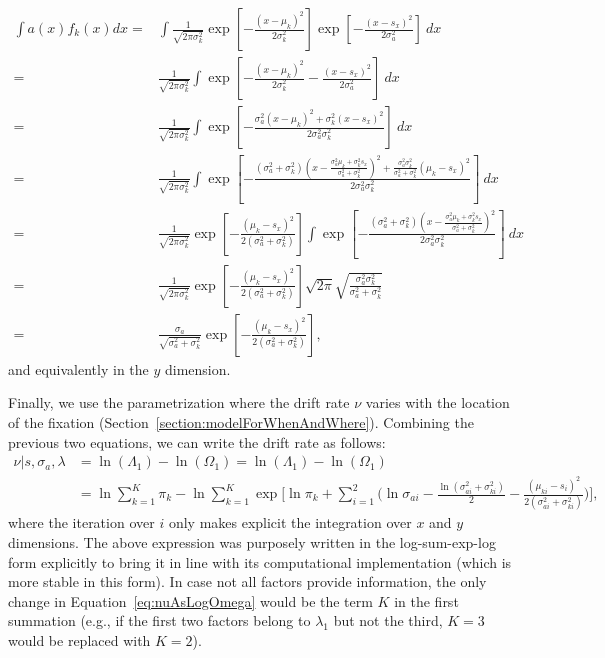 \documentclass{article}
\begin{document}
\begin{equation}
\begin{aligned}
\int a(x)f_k(x) dx = & \int \frac{1}{\sqrt{2\pi\sigma_k^2}} \exp\left[-\frac{(x-\mu_k)^2}{2\sigma_k^2}\right] \exp\left[-\frac{(x-s_x)^2}{2\sigma_a^2}\right]~dx \\
= & \frac{1}{\sqrt{2\pi\sigma_k^2}} \int \exp\left[-\frac{(x-\mu_k)^2}{2\sigma_k^2} - \frac{(x-s_x)^2}{2\sigma_a^2}\right]~dx \\
= & \frac{1}{\sqrt{2\pi\sigma_k^2}} \int \exp\left[-\frac{\sigma_a^2(x-\mu_k)^2 + \sigma_k^2(x-s_x)^2}{2\sigma_a^2\sigma_k^2} \right]~dx \\
= & \frac{1}{\sqrt{2\pi\sigma_k^2}} \int \exp\left[-\frac{(\sigma_a^2+\sigma_k^2)\left(x-\frac{\sigma_a^2\mu_k + \sigma_k^2s_x}{\sigma_a^2+\sigma_k^2}\right)^2 + \frac{\sigma_a^2\sigma_k^2}{\sigma_a^2 + \sigma_k^2}(\mu_k-s_x)^2}{2\sigma_a^2\sigma_k^2} \right]~dx \\
= & \frac{1}{\sqrt{2\pi\sigma_k^2}} \exp\left[-\frac{(\mu_k-s_x)^2}{2(\sigma_a^2 + \sigma_k^2)}\right] \int \exp\left[-\frac{(\sigma_a^2+\sigma_k^2)\left(x-\frac{\sigma_a^2\mu_k + \sigma_k^2s_x}{\sigma_a^2+\sigma_k^2}\right)^2}{2\sigma_a^2\sigma_k^2} \right]~dx \\
= & \frac{1}{\sqrt{2\pi\sigma_k^2}} \exp\left[-\frac{(\mu_k-s_x)^2}{2(\sigma_a^2 + \sigma_k^2)}\right] \sqrt{2\pi} \sqrt{\frac{\sigma_a^2\sigma_k^2}{\sigma_a^2+\sigma_k^2}} \\
= & \frac{\sigma_a}{\sqrt{\sigma_a^2+\sigma_k^2}} \exp\left[-\frac{(\mu_k-s_x)^2}{2(\sigma_a^2 + \sigma_k^2)}\right],
\end{aligned}
\end{equation}
and equivalently in the $y$ dimension.

Finally, we use the parametrization where the drift rate $\nu$ varies with the location of the fixation (Section~\ref{section:modelForWhenAndWhere}). Combining the previous two equations, we can write the drift rate as follows:
\begin{equation}
\label{eq:nuAsLogOmega}
\begin{aligned}
\nu | s, \sigma_a, \lambda & = \ln(\Lambda_1) - \ln(\Omega_1) = \ln(\Lambda_1) - \ln(\Omega_1) \\
& = \ln\sum_{k=1}^K \pi_k- \ln \sum_{k=1}^K \exp \Bigg[\ln \pi_k + \sum_{i=1}^2 \Big( \ln \sigma_{ai} - \frac{\ln (\sigma_{ai}^2+ \sigma_{ki}^2)}{2} - \frac{(\mu_{ki} - s_i)^2}{2(\sigma_{ai}^2 + \sigma_{ki}^2)} \Big)  \Bigg],
\end{aligned}
\end{equation}
where the iteration over $i$ only makes explicit the integration over $x$ and $y$ dimensions. The above expression was purposely written in the log-sum-exp-log form explicitly to bring it in line with its computational implementation (which is more stable in this form). In case not all factors provide information, the only change in Equation~\ref{eq:nuAsLogOmega} would be the term $K$ in the first summation (e.g., if the first two factors belong to $\lambda_1$ but not the third, $K=3$ would be replaced with $K=2$).
\end{document}
